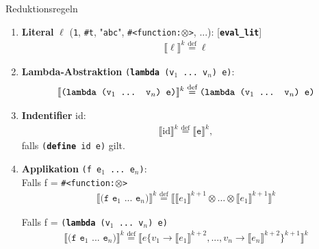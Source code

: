 \begin{contentbox}{Reduktionsregeln}
	\begin{enumerate}
		\item \textbf{Literal} $\ell$ (\texttt{1}, \texttt{\#t}, "\texttt{abc}", \texttt{\#<function:$\otimes$>}, ...): \hfill [\textbf{\texttt{eval\_lit}}]
		      \vspace{-1em}
		      \begin{align*}
			      \llbracket \ell \rrbracket^k \overset{\text{def}}{=} \ell
		      \end{align*}

		\item \textbf{Lambda-Abstraktion} \texttt{(\textbf{lambda} (v$_1$ ... v$_n$) e)}: \hfill {}
		      \vspace{-1em}
		      \begin{align*}
			      \llbracket \texttt{(\textbf{lambda} (v$_1$ ... v$_n$) e)} \rrbracket^k
			      \overset{\text{def}}{=} \texttt{(\textbf{lambda} (v$_1$ ... v$_n$) e)}
		      \end{align*}

		\item \textbf{Indentifier} id: \hfill {}
		      \vspace{-1em}
		      \begin{align*}
			      \llbracket \text{id} \rrbracket^k
			      \overset{\text{def}}{=} \llbracket\texttt{e}\rrbracket^k,
		      \end{align*}
		      \vspace{-1em}
		      falls \texttt{(\textbf{define} id e)} gilt.

		\item \textbf{Applikation} \texttt{(f e$_1$ ... e$_n$)}:\\
		      Falls f = \texttt{\#<function:$\otimes$>} \hfill {}
		      \vspace{-1em}
		      \begin{align*}
			      \llbracket \texttt{(f e$_1$ ... e$_n$)} \rrbracket^k
			      \overset{\text{def}}{=}
			      \llbracket\llbracket e_1\rrbracket^{k+1} \otimes \dots \otimes \llbracket e_1\rrbracket^{k+1}\rrbracket^k
		      \end{align*}

		      \vspace{-1em}
		      Falls f = \texttt{(\textbf{lambda} (v$_1$ ... v$_n$) e)} \hfill {}
		      \vspace{-1em}
		      \begin{align*}
			      \llbracket \texttt{(f e$_1$ ... e$_n$)} \rrbracket^k
			      \overset{\text{def}}{=}
			      \llbracket
			      e\{v_1\to\llbracket e_1\rrbracket^{k+2},..., v_n\to\llbracket e_n\rrbracket^{k+2}\}^{k+1}
			      \rrbracket^k
		      \end{align*}


\end{enumerate}
\end{contentbox}

